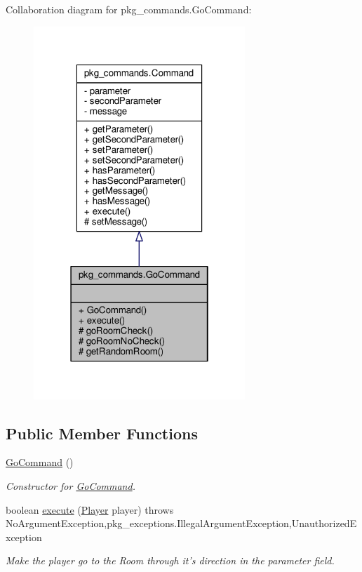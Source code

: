 Collaboration diagram for pkg\-\_\-commands.\-Go\-Command\-:
\nopagebreak
\begin{figure}[H]
\begin{center}
\leavevmode
\includegraphics[width=226pt]{classpkg__commands_1_1GoCommand__coll__graph}
\end{center}
\end{figure}
\subsection*{Public Member Functions}
\begin{DoxyCompactItemize}
\item 
\hyperlink{classpkg__commands_1_1GoCommand_af87b7ac858440df2c3d850c89441f4c7}{Go\-Command} ()
\begin{DoxyCompactList}\small\item\em Constructor for \hyperlink{classpkg__commands_1_1GoCommand}{Go\-Command}. \end{DoxyCompactList}\item 
boolean \hyperlink{classpkg__commands_1_1GoCommand_a82e9a64a0fac612f788060a90c83f9b1}{execute} (\hyperlink{classpkg__world_1_1Player}{Player} player)  throws No\-Argument\-Exception,pkg\-\_\-exceptions.\-Illegal\-Argument\-Exception,\-Unauthorized\-Exception 
\begin{DoxyCompactList}\small\item\em Make the player go to the Room through it's direction in the parameter field. \end{DoxyCompactList}\end{DoxyCompactItemize}
